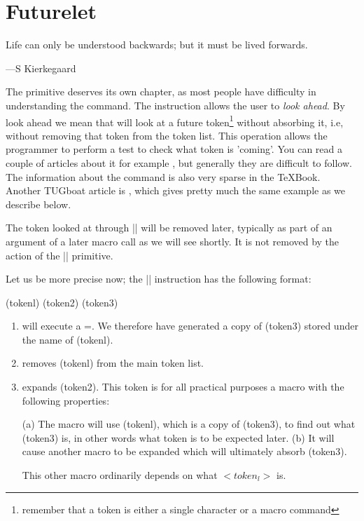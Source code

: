 \chapter{Futurelet}
\epigraph{Life can only be understood backwards; but it must be lived forwards.}{
---S Kierkegaard}

The \cmd{\futurelet} primitive deserves its own chapter, as most people have difficulty in understanding the command. The instruction allows the user to \textit{look ahead}. By look ahead we mean that \tex will look at a future token\footnote{remember that a token is either a single character or a macro command} without absorbing it, i.e, without removing that token from the token list. This operation allows the programmer to perform a test to check what token is 'coming'. You can read a couple of articles about it for example \citep{Eijkhout2001}, but generally they are difficult to follow. The information about the command is also very sparse in the TeXBook.  Another TUGboat article is \citep{bechto88}, which gives pretty much the same example as we describe below. 

The token looked at through
|\futurelet| will be removed later, typically as part
of an argument of a later macro call as we will see
shortly. It is not removed by the action of the
|\futurelet| primitive.

Let us be more precise now; the |\futurelet|
instruction has the following format:


\begin{teX}
\futurelet (tokenl) (token2) (token3)
\end{teX}


\begin{enumerate}
\item  \tex will execute a \cmd{\let}=.
We therefore have generated a copy of (token3)
stored under the name of (tokenl).\label{lettoken}


\item  removes (tokenl) from the main token list.

\item \tex expands (token2). This token is for all
practical purposes a macro with the following
properties:

(a) The macro will use (tokenl), which is a
copy of (token3), to find out what (token3)
is, in other words what token is to be
expected later.
(b) It will cause another macro to be expanded
which will ultimately absorb (token3).

This other macro ordinarily depends on
what $<token_l>$ is.

\end{enumerate}

